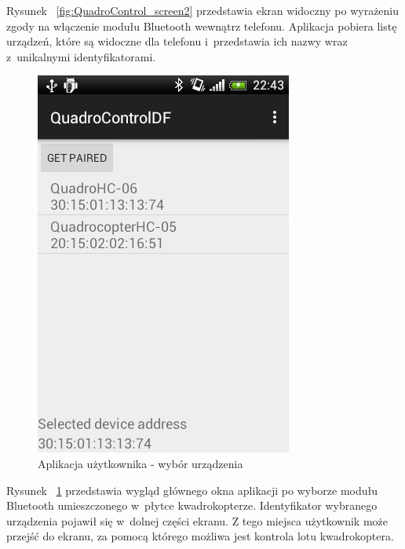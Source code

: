 Rysunek ~\ref{fig:QuadroControl_screen2} przedstawia ekran widoczny po wyrażeniu zgody na włączenie modułu Bluetooth wewnątrz telefonu. Aplikacja pobiera listę urządzeń, które są widoczne dla telefonu i~przedstawia ich nazwy wraz z~unikalnymi identyfikatorami. 

\begin{figure}[htbp]
	\centering
	\includegraphics[scale=0.6]{Pictures/DroidAtScreen/droid@screen-3.png}
	\caption[Aplikacja użytkownika - wybór urządzenia]{Aplikacja użytkownika - wybór urządzenia}
	\label{fig:QuadroControl_screen3}
\end{figure}

Rysunek ~\ref{fig:QuadroControl_screen3} przedstawia wygląd głównego okna aplikacji po wyborze modułu Bluetooth umieszczonego w~płytce kwadrokopterze. Identyfikator wybranego urządzenia pojawił się w~dolnej części ekranu. Z tego miejsca użytkownik może przejść do ekranu, za pomocą którego możliwa jest kontrola lotu kwadrokoptera.

